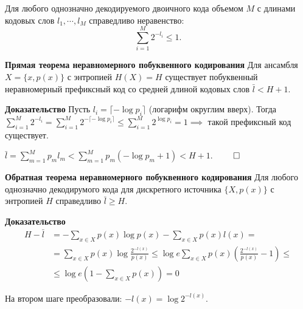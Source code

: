 

Для любого однозначно декодируемого двоичного кода объемом $M$ с длинами
кодовых слов $l_1, \cdots, l_M$ справедливо неравенство:
\[
    \sum_{i=1}^M 2^{-l_i} \leq 1.
\]

\textbf{Прямая теорема неравномерного побуквенного кодирования} Для ансамбля $X
= \{x, p(x)\}$ с энтропией $H(X) = H$ существует побуквенный неравномерный
префиксный код со средней длиной кодовых слов $\bar l < H + 1$.

\textbf{Доказательство} Пусть $l_i = \lceil -\log p_i \rceil$ (логарифм
округлим вверх). Тогда $\sum_{i=1}^M 2^{-l_i}
= \sum_{i=1}^M 2^{- \lceil -\log p_i \rceil} \leq \sum_{i=1}^M 2^{\log p_i} = 1 \implies$
такой префиксный код существует.

$\bar l = \sum_{m=1}^M p_m l_m < \sum_{m=1}^M p_m(-\log p_m + 1) < H+1$.
$\qed$

\textbf{Обратная теорема неравномерного побуквенного кодирования} Для любого
однозначно декодирумого кода для дискретного источника $\{X, p(x)\}$ с
энтропией $H$ справедливо $\bar l \geq H$.

\textbf{Доказательство}
\begin{align*}
    H - \bar l &= -\sum_{x\in X} p(x) \log p(x) - \sum_{x \in X} p(x) l(x) =
                \\
               &= \sum_{x \in  X} p(x) \log \frac{2^{-l(x)}}{p(x)} \leq \log e
               \sum_{x \in X} p(x) \left( \frac{2^{-l(x)}}{p(x)} - 1 \right)
               \leq 
               \\
               &\leq \log e \left( 1 - \sum_{x \in X} p(x) \right) = 0
\end{align*}

На втором шаге преобразовали: $- l(x) = \log 2^{-l(x)}$.

